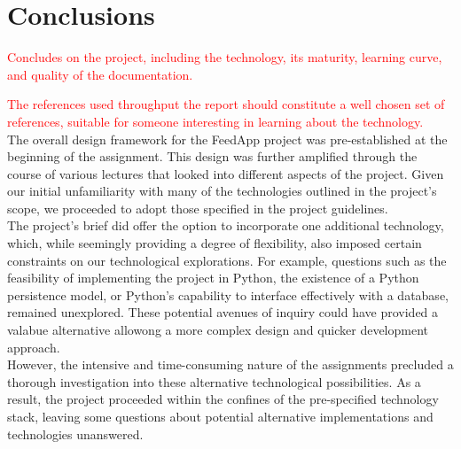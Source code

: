 \clearpage
\section{Conclusions}

\textcolor{red}{Concludes on the project, including the technology, its maturity, learning curve, and quality of the documentation.}

\textcolor{red}{The references used throughput the report should constitute a well chosen set of references, suitable for someone interesting in learning about the technology.}\\



\noindent The overall design framework for the FeedApp project was pre-established at the beginning of the assignment. This design was further amplified through the course of various lectures that looked into different aspects of the project.  Given our initial unfamiliarity with many of the technologies outlined in the project's scope, we proceeded to adopt those specified in the project guidelines.\\

\noindent The project's brief did offer the option to incorporate one additional technology, which, while seemingly providing a degree of flexibility, also imposed certain constraints on our technological explorations. For example, questions such as the feasibility of implementing the project in Python, the existence of a Python persistence model, or Python's capability to interface effectively with a database, remained unexplored. These potential avenues of inquiry could have provided a valabue alternative allowong a more complex design and quicker development approach.\\

\noindent However, the intensive and time-consuming nature of the assignments precluded a thorough investigation into these alternative technological possibilities. As a result, the project proceeded within the confines of the pre-specified technology stack, leaving some questions about potential alternative implementations and technologies unanswered.